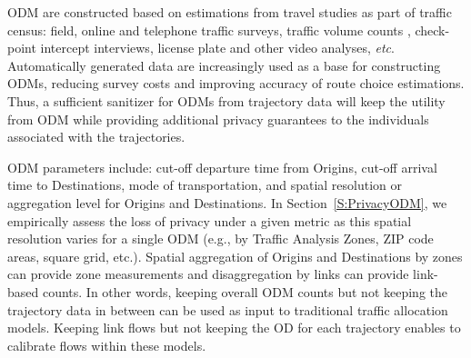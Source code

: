 \documentclass[times,twocolumn,final,authoryear]{elsarticle}
\begin{document}
\begin{table}[]
\caption{An Origin Destination Matrix from a spatial interaction survey}
\centering

\label{table:ODMeg} 
\end{table}

ODM are constructed based on estimations from travel studies as part of traffic census: field, online and telephone traffic surveys, traffic volume counts \citep{robillard1975}, check-point intercept interviews, license plate and other video analyses, {\it etc}.  
Automatically generated data \citep[e.g. CDR]{iqbal2014} are increasingly used as a base for constructing ODMs, reducing survey costs and improving accuracy of route choice estimations. 
Thus, a sufficient sanitizer for ODMs from trajectory data will keep the utility from ODM while providing additional privacy guarantees to the individuals associated with the trajectories. 

ODM parameters include: cut-off departure time from Origins, cut-off arrival time to Destinations, mode of transportation, and spatial resolution or aggregation level for Origins and Destinations. 
In Section~\ref{S:PrivacyODM}, we empirically assess the loss of privacy under a given metric as this spatial resolution varies for a single ODM (e.g., by Traffic Analysis Zones, ZIP code areas, square grid, etc.). Spatial aggregation of Origins and Destinations by zones can provide zone measurements and disaggregation by links can provide link-based counts. 
In other words, keeping overall ODM counts but not keeping the trajectory data in between can be used as input to traditional traffic allocation models. Keeping link flows but not keeping the OD for each trajectory enables to calibrate flows within these models.
\end{document}
